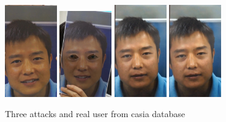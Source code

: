 \begin{figure}[htb]
\centering
\includegraphics[width=0.2\textwidth]{images_databases/casia/at1-2.jpg}
\includegraphics[width=0.2\textwidth]{images_databases/casia/at2-2.jpg}
\includegraphics[width=0.2\textwidth]{images_databases/casia/at3-2.jpg}
\includegraphics[width=0.2\textwidth]{images_databases/casia/real2.jpg}

\caption{Three attacks and real user from casia database } \label{fig:casia2}
\end{figure}
 
